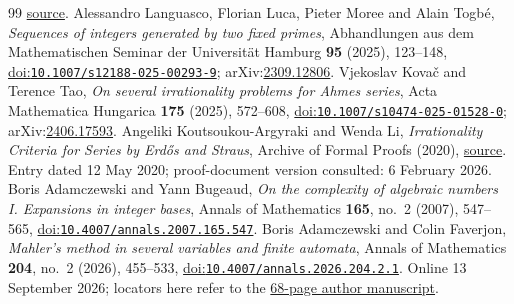 \documentclass[11pt]{article}
\begin{document}
\begin{thebibliography}{99}
  \href{https://www.numdam.org/article/CM_1974__29_3_273_0.pdf}{source}.
 Alessandro Languasco, Florian Luca, Pieter Moree and Alain Togb\'{e},
  \emph{Sequences of integers generated by two fixed primes}, Abhandlungen aus dem Mathematischen Seminar der Universität Hamburg \textbf{95} (2025), 123--148,
  \href{https://doi.org/10.1007/s12188-025-00293-9}{doi:\nolinkurl{10.1007/s12188-025-00293-9}}; arXiv:\href{https://arxiv.org/abs/2309.12806}{2309.12806}.
 Vjekoslav Kova\v{c} and Terence Tao,
  \emph{On several irrationality problems for Ahmes series}, Acta Mathematica Hungarica \textbf{175} (2025), 572--608,
  \href{https://doi.org/10.1007/s10474-025-01528-0}{doi:\nolinkurl{10.1007/s10474-025-01528-0}}; arXiv:\href{https://arxiv.org/abs/2406.17593}{2406.17593}.
 Angeliki Koutsoukou-Argyraki and Wenda Li,
  \emph{Irrationality Criteria for Series by Erd\H{o}s and Straus}, Archive of Formal Proofs (2020),
  \href{https://isa-afp.org/entries/Irrational_Series_Erdos_Straus.html}{source}. Entry dated 12 May 2020; proof-document version consulted: 6 February 2026.
 Boris Adamczewski and Yann Bugeaud,
  \emph{On the complexity of algebraic numbers I. Expansions in integer bases},
  Annals of Mathematics \textbf{165}, no.~2 (2007), 547--565,
  \href{https://doi.org/10.4007/annals.2007.165.547}{doi:\nolinkurl{10.4007/annals.2007.165.547}}.
 Boris Adamczewski and Colin Faverjon,
  \emph{Mahler's method in several variables and finite automata},
  Annals of Mathematics \textbf{204}, no.~2 (2026), 455--533,
  \href{https://doi.org/10.4007/annals.2026.204.2.1}{doi:\nolinkurl{10.4007/annals.2026.204.2.1}}.
  Online 13 September 2026; locators here refer to the
  \href{https://faverjon.perso.math.cnrs.fr/AdamczewskiFaverjon_MahlerFiniteAutomata.pdf}{68-page author manuscript}.
\end{thebibliography}
\end{document}
